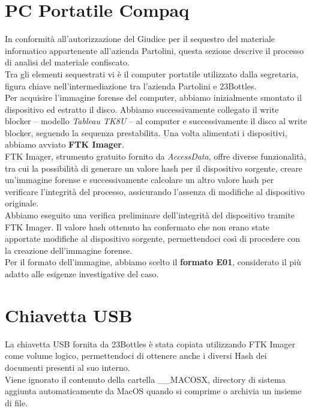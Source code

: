 \section{PC Portatile Compaq}
In conformità all’autorizzazione del Giudice per il sequestro del materiale informatico appartenente all’azienda Partolini, questa sezione descrive il processo di analisi del materiale confiscato.\\
Tra gli elementi sequestrati vi è il computer portatile utilizzato dalla segretaria, figura chiave nell’intermediazione tra l’azienda Partolini e 23Bottles.\vspace{14pt}\\
Per acquisire l’immagine forense del computer, abbiamo inizialmente smontato il dispositivo ed estratto il disco. Abbiamo successivamente collegato il write blocker -- modello \textit{Tableau TK8U} --  al computer e successivamente il disco al write blocker, seguendo la sequenza prestabilita. Una volta alimentati i dispositivi, abbiamo avviato \textbf{FTK Imager}.\vspace{14pt}\\
FTK Imager, strumento gratuito fornito da \textit{AccessData}, offre diverse funzionalità, tra cui la possibilità di generare un valore hash per il dispositivo sorgente, creare un’immagine forense e successivamente calcolare un altro valore hash per verificare l’integrità del processo, assicurando l’assenza di modifiche al dispositivo originale.\vspace{14pt}\\
Abbiamo eseguito una verifica preliminare dell’integrità del dispositivo tramite FTK Imager. Il valore hash ottenuto ha confermato che non erano state apportate modifiche al dispositivo sorgente, permettendoci così di procedere con la creazione dell’immagine forense.\vspace{14pt}\\
Per il formato dell’immagine, abbiamo scelto il \textbf{formato E01}, considerato il più adatto alle esigenze investigative del caso.

\section{Chiavetta USB}
La chiavetta USB fornita da 23Bottles è stata copiata utilizzando FTK Imager come volume logico, permettendoci di ottenere anche i diversi Hash dei documenti presenti al suo interno.\vspace{14pt}\\
Viene ignorato il contenuto della cartella \_\_MACOSX, directory di sistema aggiunta automaticamente da MacOS quando si comprime o archivia un insieme di file.